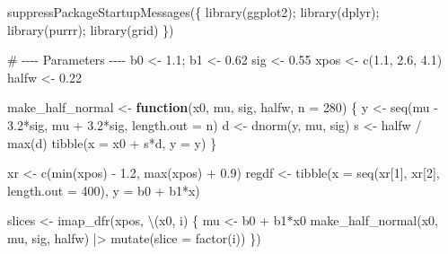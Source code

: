 \documentclass[
  letterpaper,
  DIV=11,
  numbers=noendperiod]{scrreprt}
\newenvironment{Shaded}{\begin{snugshade}}{\end{snugshade}}
\newcommand{\AttributeTok}[1]{\textcolor[rgb]{0.40,0.45,0.13}{#1}}
\newcommand{\CommentTok}[1]{\textcolor[rgb]{0.37,0.37,0.37}{#1}}
\newcommand{\ControlFlowTok}[1]{\textcolor[rgb]{0.00,0.23,0.31}{\textbf{#1}}}
\newcommand{\DecValTok}[1]{\textcolor[rgb]{0.68,0.00,0.00}{#1}}
\newcommand{\FloatTok}[1]{\textcolor[rgb]{0.68,0.00,0.00}{#1}}
\newcommand{\FunctionTok}[1]{\textcolor[rgb]{0.28,0.35,0.67}{#1}}
\newcommand{\NormalTok}[1]{\textcolor[rgb]{0.00,0.23,0.31}{#1}}
\newcommand{\OtherTok}[1]{\textcolor[rgb]{0.00,0.23,0.31}{#1}}
\newcommand{\SpecialCharTok}[1]{\textcolor[rgb]{0.37,0.37,0.37}{#1}}
\begin{document}
\begin{Shaded}
\begin{Highlighting}[]
\FunctionTok{suppressPackageStartupMessages}\NormalTok{(\{}
  \FunctionTok{library}\NormalTok{(ggplot2); }\FunctionTok{library}\NormalTok{(dplyr); }\FunctionTok{library}\NormalTok{(purrr); }\FunctionTok{library}\NormalTok{(grid)}
\NormalTok{\})}

\CommentTok{\# {-}{-}{-}{-} Parameters {-}{-}{-}{-}}
\NormalTok{b0 }\OtherTok{\textless{}{-}} \FloatTok{1.1}\NormalTok{; b1 }\OtherTok{\textless{}{-}} \FloatTok{0.62}
\NormalTok{sig }\OtherTok{\textless{}{-}} \FloatTok{0.55}
\NormalTok{xpos }\OtherTok{\textless{}{-}} \FunctionTok{c}\NormalTok{(}\FloatTok{1.1}\NormalTok{, }\FloatTok{2.6}\NormalTok{, }\FloatTok{4.1}\NormalTok{)}
\NormalTok{halfw }\OtherTok{\textless{}{-}} \FloatTok{0.22}

\NormalTok{make\_half\_normal }\OtherTok{\textless{}{-}} \ControlFlowTok{function}\NormalTok{(x0, mu, sig, halfw, }\AttributeTok{n =} \DecValTok{280}\NormalTok{) \{}
\NormalTok{  y }\OtherTok{\textless{}{-}} \FunctionTok{seq}\NormalTok{(mu }\SpecialCharTok{{-}} \FloatTok{3.2}\SpecialCharTok{*}\NormalTok{sig, mu }\SpecialCharTok{+} \FloatTok{3.2}\SpecialCharTok{*}\NormalTok{sig, }\AttributeTok{length.out =}\NormalTok{ n)}
\NormalTok{  d }\OtherTok{\textless{}{-}} \FunctionTok{dnorm}\NormalTok{(y, mu, sig)}
\NormalTok{  s }\OtherTok{\textless{}{-}}\NormalTok{ halfw }\SpecialCharTok{/} \FunctionTok{max}\NormalTok{(d)}
  \FunctionTok{tibble}\NormalTok{(}\AttributeTok{x =}\NormalTok{ x0 }\SpecialCharTok{+}\NormalTok{ s}\SpecialCharTok{*}\NormalTok{d, }\AttributeTok{y =}\NormalTok{ y)}
\NormalTok{\}}

\NormalTok{xr }\OtherTok{\textless{}{-}} \FunctionTok{c}\NormalTok{(}\FunctionTok{min}\NormalTok{(xpos) }\SpecialCharTok{{-}} \FloatTok{1.2}\NormalTok{, }\FunctionTok{max}\NormalTok{(xpos) }\SpecialCharTok{+} \FloatTok{0.9}\NormalTok{)}
\NormalTok{regdf }\OtherTok{\textless{}{-}} \FunctionTok{tibble}\NormalTok{(}\AttributeTok{x =} \FunctionTok{seq}\NormalTok{(xr[}\DecValTok{1}\NormalTok{], xr[}\DecValTok{2}\NormalTok{], }\AttributeTok{length.out =} \DecValTok{400}\NormalTok{),}
                \AttributeTok{y =}\NormalTok{ b0 }\SpecialCharTok{+}\NormalTok{ b1}\SpecialCharTok{*}\NormalTok{x)}

\NormalTok{slices }\OtherTok{\textless{}{-}} \FunctionTok{imap\_dfr}\NormalTok{(xpos, \textbackslash{}(x0, i) \{}
\NormalTok{  mu }\OtherTok{\textless{}{-}}\NormalTok{ b0 }\SpecialCharTok{+}\NormalTok{ b1}\SpecialCharTok{*}\NormalTok{x0}
  \FunctionTok{make\_half\_normal}\NormalTok{(x0, mu, sig, halfw) }\SpecialCharTok{|\textgreater{}}
    \FunctionTok{mutate}\NormalTok{(}\AttributeTok{slice =} \FunctionTok{factor}\NormalTok{(i))}
\NormalTok{\})}


\end{Highlighting}
\end{Shaded}
\end{document}
